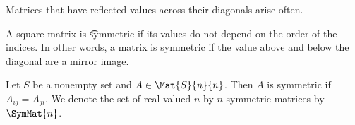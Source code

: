

Matrices that have reflected values
across their diagonals arise often.


A square matrix is \t{symmetric} if its values do not depend on the order of the indices.
In other words, a matrix is symmetric if the value above and below the diagonal are a mirror image.



Let $S$ be a nonempty set and $A \in \Mat{S}{n}{n}$.
Then $A$ is symmetric if $A_{ij} = A_{ji}$.
We denote the set of real-valued $n$ by $n$
symmetric matrices by $\SymMat{n}$.
